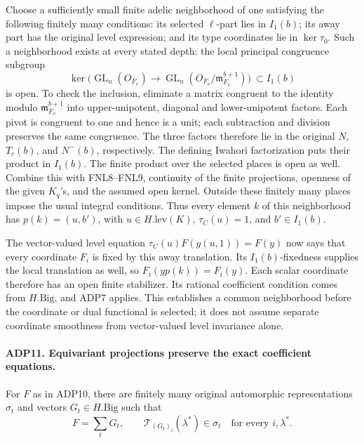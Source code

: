 \documentclass[11pt,a4paper]{article}
\numberwithin{equation}{section}
\theoremstyle{remark}\newtheorem{remark}[theorem]{Remark}
\begin{document}
Choose a sufficiently small finite adelic neighborhood of one satisfying
the following finitely many conditions: its selected \(\ell\)-part lies
in \(I_1(b)\); its away part has the original level expression; and
its type coordinates lie in \(\ker\tau_0\).  Such a neighborhood
exists at every stated depth: the local principal congruence subgroup
\[
 \ker\bigl(\operatorname{GL}_n(O_{F_v})\longrightarrow
              \operatorname{GL}_n(O_{F_v}/\mathfrak m_{F_v}^{b+1})\bigr)
                         \ \subset I_1(b)
\]
is open.  To check the inclusion, eliminate a matrix congruent to the
identity modulo \(\mathfrak m_{F_v}^{b+1}\) into upper-unipotent,
diagonal and lower-unipotent factors.  Each pivot is congruent to one
and hence is a unit; each subtraction and division preserves the same
congruence.  The three factors therefore lie in the original
\(N\), \(T_c(b)\), and \(N^-(b)\), respectively.  The defining
Iwahori factorization puts their product in \(I_1(b)\).  The finite
product over the selected places is open as well.  Combine this with
FNL8--FNL9, continuity of the finite projections, openness of
the given \(K_q\)'s, and the assumed open kernel.  Outside these
finitely many places impose the usual integral conditions.  Thus every
element \(k\) of this neighborhood has
\(p(k)=(u,b')\), with \(u\in H.\mathrm{lev}(K)\),
\(\tau_C(u)=1\), and \(b'\in I_1(b)\).

The vector-valued level equation
\(\tau_C(u)F(y(u,1))=F(y)\) now says that every coordinate \(F_i\)
is fixed by this away translation.  Its \(I_1(b)\)-fixedness supplies
the local translation as well, so \(F_i(yp(k))=F_i(y)\).
Each scalar coordinate therefore has an open finite stabilizer.  Its
rational coefficient condition comes from \(H.\mathrm{Big}\), and
ADP7 applies.  This establishes a common neighborhood before the
coordinate or dual functional is selected; it does not assume separate
coordinate smoothness from vector-valued level invariance alone.

\paragraph{ADP11. Equivariant projections preserve the exact coefficient equations.}
\label{claim:ADP11}
For \(F\) as in ADP10, there are finitely many original automorphic
representations \(\sigma_t\) and vectors \(G_t\in H.\mathrm{Big}\)
such that
\[
 F=\sum_tG_t,\qquad
            \mathcal T_{(G_t)_i}(\lambda^*)\in\sigma_t
                         \quad\text{for every }i,\lambda^*.
\]
\end{document}
